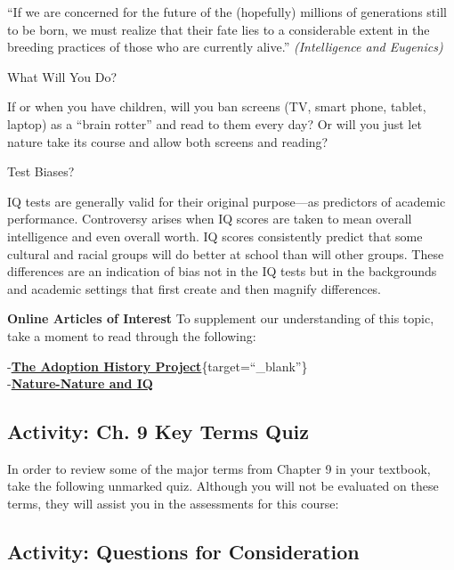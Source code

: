 \documentclass[
]{book}
\begin{document}
``If we are concerned for the future of the (hopefully) millions of generations still to be born, we must realize that their fate lies to a considerable extent in the breeding practices of those who are currently alive.'' \emph{(Intelligence and Eugenics)}

{What Will You Do?}

If or when you have children, will you ban screens (TV, smart phone, tablet, laptop) as a ``brain rotter'' and read to them every day? Or will you just let nature take its course and allow both screens and reading?

{Test Biases?}

IQ tests are generally valid for their original purpose---as predictors of academic performance. Controversy arises when IQ scores are taken to mean overall intelligence and even overall worth. IQ scores consistently predict that some cultural and racial groups will do better at school than will other groups. These differences are an indication of bias not in the IQ tests but in the backgrounds and academic settings that first create and then magnify differences.

\begin{caution}
\textbf{Online Articles of Interest}
To supplement our understanding of this topic, take a moment to read through the following:

-\href{https://darkwing.uoregon.edu/~adoption/topics/naturenurturestudies.htm}{\textbf{The Adoption History Project}}\{target=``\_blank''\}\\
-\href{http://unisci.com/stories/20012/0417014.htm}{\textbf{Nature-Nature and IQ}}
\end{caution}

\hypertarget{activity-ch.-9-key-terms-quiz}{%
\subsection*{Activity: Ch. 9 Key Terms Quiz}\label{activity-ch.-9-key-terms-quiz}}

\begin{reflect}
In order to review some of the major terms from Chapter 9 in your textbook, take the following unmarked quiz. Although you will not be evaluated on these terms, they will assist you in the assessments for this course:
\end{reflect}

\hypertarget{activity-questions-for-consideration-5}{%
\subsection*{Activity: Questions for Consideration}\label{activity-questions-for-consideration-5}}
\end{document}
